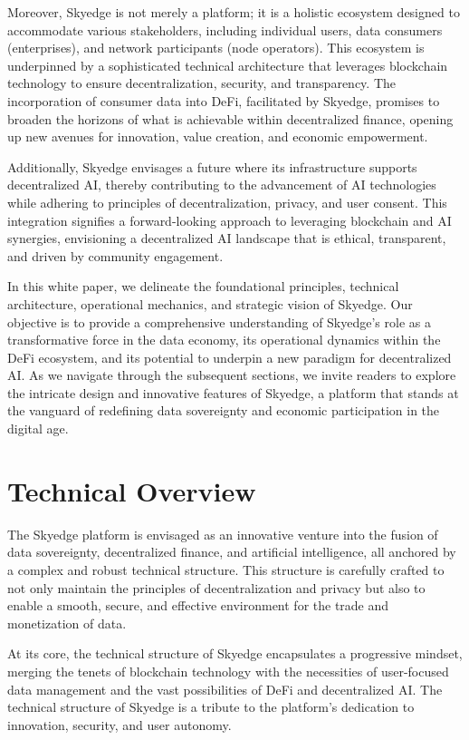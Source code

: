 \documentclass{article}
\begin{document}
Moreover, Skyedge is not merely a platform; it is a holistic ecosystem designed to accommodate various stakeholders, including individual users, data consumers (enterprises), and network participants (node operators). This ecosystem is underpinned by a sophisticated technical architecture that leverages blockchain technology to ensure decentralization, security, and transparency. The incorporation of consumer data into DeFi, facilitated by Skyedge, promises to broaden the horizons of what is achievable within decentralized finance, opening up new avenues for innovation, value creation, and economic empowerment.

Additionally, Skyedge envisages a future where its infrastructure supports decentralized AI, thereby contributing to the advancement of AI technologies while adhering to principles of decentralization, privacy, and user consent. This integration signifies a forward-looking approach to leveraging blockchain and AI synergies, envisioning a decentralized AI landscape that is ethical, transparent, and driven by community engagement.

In this white paper, we delineate the foundational principles, technical architecture, operational mechanics, and strategic vision of Skyedge. Our objective is to provide a comprehensive understanding of Skyedge's role as a transformative force in the data economy, its operational dynamics within the DeFi ecosystem, and its potential to underpin a new paradigm for decentralized AI. As we navigate through the subsequent sections, we invite readers to explore the intricate design and innovative features of Skyedge, a platform that stands at the vanguard of redefining data sovereignty and economic participation in the digital age.

\pagebreak

\section{Technical Overview}

The Skyedge platform is envisaged as an innovative venture into the fusion of data sovereignty, decentralized finance, and artificial intelligence, all anchored by a complex and robust technical structure. This structure is carefully crafted to not only maintain the principles of decentralization and privacy but also to enable a smooth, secure, and effective environment for the trade and monetization of data. 

At its core, the technical structure of Skyedge encapsulates a progressive mindset, merging the tenets of blockchain technology with the necessities of user-focused data management and the vast possibilities of DeFi and decentralized AI. The technical structure of Skyedge is a tribute to the platform's dedication to innovation, security, and user autonomy. 
\end{document}
